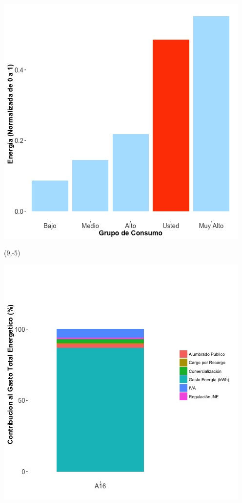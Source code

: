 \documentclass{article}\usepackage[]{graphicx}\usepackage[]{color}
\newenvironment{knitrout}{}{} %
\begin{document}
\begin{knitrout}
\color{fgcolor}
\includegraphics[scale=0.65]{figure/A16_neighbor_plot} 
\end{knitrout}

 \begin{textblock}{1}(9,-5)
\begin{minipage}{20em}
\begingroup

\endgroup
\end{minipage}
\end{textblock}

\begin{knitrout}
\color{fgcolor}
\includegraphics[scale=0.65]{figure/A16_costvars_plot.jpg} 
\end{knitrout}
\end{document}
